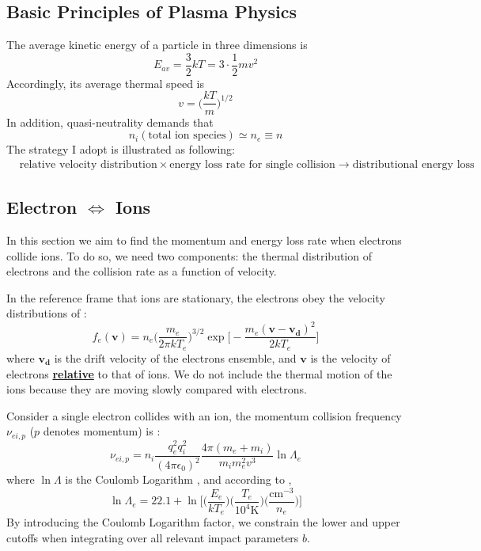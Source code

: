 \documentclass{article}
\begin{document}
\subsection{Basic Principles of Plasma Physics}
The average kinetic energy of a particle in three dimensions is
\begin{equation}
	E_{av} = \frac{3}{2}kT = 3 \cdot \frac{1}{2} m v^2
\end{equation}
Accordingly, its average thermal speed is
\begin{equation}
	v = \Big(\frac{kT}{m} \Big)^{1/2}
\end{equation}
In addition, quasi-neutrality demands that
\begin{equation}
	n_i (\text{total ion species}) \simeq n_e \equiv n
\end{equation}
The strategy I adopt is illustrated as following:
\begin{equation*}
	\begin{split}
		&\text{relative velocity distribution} \times \text{energy loss rate for single collision} \rightarrow \text{distributional energy loss }
	\end{split}
\end{equation*}
\subsection{Electron $\Longleftrightarrow$ Ions}
In this section we aim to find the momentum and energy loss rate when electrons collide ions. To do so, we need two components: the thermal distribution of electrons and the collision rate as a function of velocity. 

In the reference frame that ions are stationary, the electrons obey the velocity distributions of \cite{Fitzpatrick:2014pp}:
\begin{equation}
	\label{eq_f_e}
	f_e(\bm{v}) = n_e \Big(\frac{m_e}{2\pi kT_e} \Big)^{3/2} \exp\Big[-\frac{m_e(\bm{v} - \bm{v_d})^2}{2kT_e} \Big]
\end{equation}
where $\bm{v_d}$ is the drift velocity of the electrons ensemble, and $\bm{v}$ is the velocity of electrons \underline{\textbf{relative}} to that of ions. We do not include the thermal motion of the ions because they are moving slowly compared with electrons.

Consider a single electron collides with an ion, the momentum collision frequency $\nu_{ei,p}$ ($p$ denotes momentum) is \cite{Chen:2016it}:
\begin{equation}
	\label{eq_nu_ei}
	\nu_{ei,p} = n_i\frac{q_e^2 q_i^2}{(4\pi \epsilon_0 )^2}\frac{4\pi(m_e+m_i)}{m_i m_e^2 v^3} \ln \Lambda_e
\end{equation}
where $\ln \Lambda$ is the Coulomb Logarithm , and according to \cite{Draine:2011po},
\begin{equation}
	\label{eq_lambda_e}
	\ln \Lambda_e = 22.1 + \ln \Big[\Big(\frac{E_e}{kT_e} \Big)\Big(\frac{T_e}{10^4 \text{K}} \Big)\Big(\frac{\text{cm}^{-3}}{n_e} \Big) \Big]
\end{equation}
By introducing the Coulomb Logarithm factor, we constrain the lower and upper cutoffs when integrating over all relevant impact parameters $b$.
\end{document}
